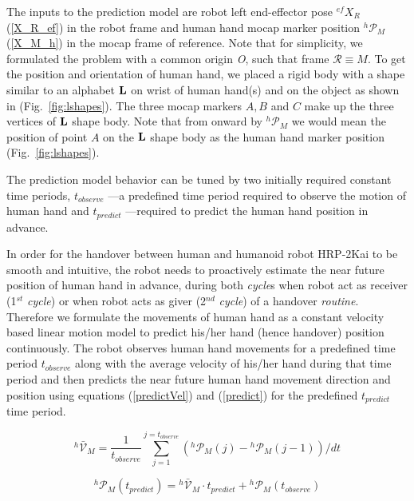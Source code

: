 The inputs to the prediction model are robot left end-effector pose $\mathcal{}^{ef}{X}_R$ (\ref{X_R_ef}) in the robot frame and human hand mocap marker position ${}^{h}\mathcal{P}_M$ (\ref{X_M_h}) in the mocap frame of reference. Note that for simplicity, we formulated the problem with a common origin {\it O}, such that frame $\mathcal R \equiv M$. To get the position and orientation of human hand, we placed a rigid body with a shape similar to an alphabet ${\bf L}$ on wrist of human hand(s) and on the object as shown in (Fig.~\ref{fig:lshapes}). The three mocap markers $A, B$ and $C$ make up the three vertices of ${\bf L}$ shape body. Note that from onward by ${}^{h}\mathcal{P}_M$ we would mean the position of point $A$ on the ${\bf L}$ shape body as the human hand marker position (Fig.~\ref{fig:lshapes}).

The prediction model behavior can be tuned by two initially required constant time periods, $t_{observe}$ ---a predefined time period required to observe the motion of human hand and $t_{predict}$ ---required to predict the human hand position in advance.

In order for the handover between human and humanoid robot HRP-2Kai to be smooth and intuitive, the robot needs to proactively estimate the near future position of human hand in advance, during both \textit{cycle}s when robot act as receiver (1$^{st}$ \textit{cycle}) or when robot acts as giver (2$^{nd}$ \textit{cycle}) of a handover \textit{routine}. Therefore we formulate the movements of human hand as a constant velocity based linear motion model to predict his/her hand (hence handover) position continuously. The robot observes human hand movements for a predefined time period $t_{observe}$ along with the average velocity of his/her hand during that time period and then predicts the near future human hand movement direction and position using equations (\ref{predictVel}) and (\ref{predict}) for the predefined  $t_{predict}$ time period.

\begin{equation} \label{predictVel}
{}^{h}\mathcal{\bar{V}}_{M} = \frac{1}{t_{observe}}{\sum_{j=1}^{j=t_{observe}} ({}^{h}\mathcal{P}_{M}(j)-{}^{h}\mathcal{P}_{M}(j-1))/dt }
\end{equation}

\begin{equation} \label{predict}
{}^{h}\mathcal{P}_M(t_{predict}) = {}^{h}\mathcal{\bar{V}}_{M} \cdot t_{predict}  + {}^{h}\mathcal{P}_{M}(t_{observe})
\end{equation}


